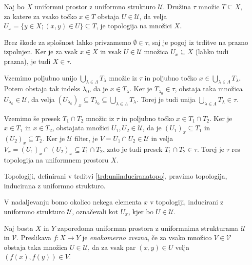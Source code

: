 \documentclass[mat1]{fmfdelo}
\newcommand{\Ucurl}{\mathcal{U}}
\begin{document}
\begin{trditev}\label{trd:uniinduciranatopo}
Naj bo $X$ uniformni prostor z uniformno strukturo $\mathcal{U}$. Družina $\tau$ množic $T \subseteq X$, za katere za vsako točko $x \in T$ obstaja $U \in \mathcal{U}$, da velja $U_x = \lbrace y \in X ; (x, y) \in U \rbrace \subseteq T$, je topologija na množici $X$.
\end{trditev}

\begin{dokaz}
Brez škode za splošnost lahko privzamemo $\emptyset \in \tau$, saj je pogoj iz trditve na prazno izpolnjen. Ker je za vsak $x \in X$ in vsak $U \in \Ucurl$ množica $U_x \subseteq X$ (lahko tudi prazna), je tudi $X \in \tau$.

Vzemimo poljubno unijo $\bigcup_{\lambda \in \Lambda} T_\lambda$ množic iz $\tau$ in poljubno točko $x \in \bigcup_{\lambda \in \Lambda} T_\lambda$. Potem obstaja
tak indeks $\lambda_0$, da je $x \in T_\lambda$. Ker je $T_{\lambda_0} \in \tau$, obstaja taka množica $U_ {\lambda_0} \in \Ucurl$, da velja $(U_{\lambda_0})_x \subseteq T_{\lambda_0} \subseteq \bigcup_{\lambda \in \Lambda} T_\lambda$. Torej je tudi unija $\bigcup_{\lambda \in \Lambda} T_\lambda \in \tau$.

Vzemimo še presek $T_1 \cap T_2$ množic iz $\tau$ in poljubno točko $x \in T_1 \cap T_2$. Ker je $x \in T_1$ in $x \in T_2$, obstajata množici $U_1, U_2 \in \Ucurl$, da je $(U_{1})_x \subseteq T_1$ in $(U_{2})_x \subseteq T_2$. Ker je $\Ucurl$ filter, je $V = U_1 \cap U_2 \in \Ucurl$ in velja
$V_x = (U_{1})_x\cap (U_{2})_x \subseteq T_1 \cap T_2$, zato je tudi presek $T_1 \cap T_2 \in \tau$. Torej je $\tau$ res topologija na uniformnem prostoru $X$.
\end{dokaz}

\begin{definicija}\label{def:uniinduciranatopo}
Topologiji, definirani v trditvi \ref{trd:uniinduciranatopo}, pravimo topologija, inducirana z uniformno strukturo.
\end{definicija}

\begin{opomba}
	V nadaljevanju bomo okolico nekega elementa $x$ v topologiji, in\-du\-ci\-ra\-ni z uniformno strukturo $\mathcal{U}$, označevali kot $U_x$, kjer bo $U \in \mathcal{U}$.
\end{opomba}

\begin{definicija}\label{def:enakzveznost}
	Naj bosta $X$ in $Y$ zaporedoma uniformna prostora z uniformnima strukturama $\mathcal{U}$ in $\mathcal{V}$. Preslikava $f\colon X \to Y$ je \emph{enakomerno zvezna}, če za vsako množico $V \in \mathcal{V}$ obstaja taka množica $U \in \mathcal{U}$, da za vsak par $(x, y) \in U$ velja $(f(x), f(y)) \in V$.
\end{definicija}
\end{document}

